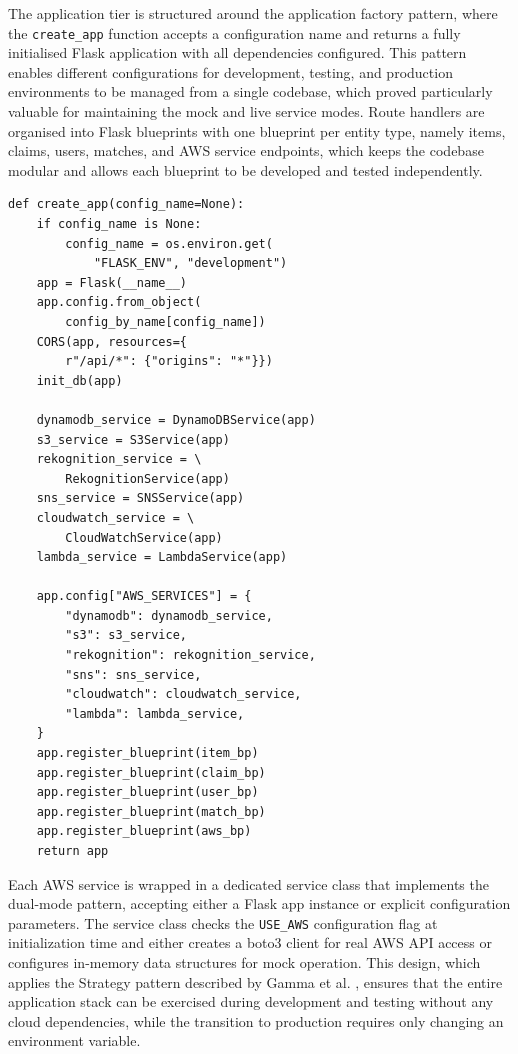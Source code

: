 \documentclass[conference]{IEEEtran}
\begin{document}
The application tier is structured around the application factory pattern, where the \texttt{create\_app} function accepts a configuration name and returns a fully initialised Flask application with all dependencies configured. This pattern enables different configurations for development, testing, and production environments to be managed from a single codebase, which proved particularly valuable for maintaining the mock and live service modes. Route handlers are organised into Flask blueprints with one blueprint per entity type, namely items, claims, users, matches, and AWS service endpoints, which keeps the codebase modular and allows each blueprint to be developed and tested independently.

\begin{lstlisting}[caption={Application factory with AWS service initialization}]
def create_app(config_name=None):
    if config_name is None:
        config_name = os.environ.get(
            "FLASK_ENV", "development")
    app = Flask(__name__)
    app.config.from_object(
        config_by_name[config_name])
    CORS(app, resources={
        r"/api/*": {"origins": "*"}})
    init_db(app)

    dynamodb_service = DynamoDBService(app)
    s3_service = S3Service(app)
    rekognition_service = \
        RekognitionService(app)
    sns_service = SNSService(app)
    cloudwatch_service = \
        CloudWatchService(app)
    lambda_service = LambdaService(app)

    app.config["AWS_SERVICES"] = {
        "dynamodb": dynamodb_service,
        "s3": s3_service,
        "rekognition": rekognition_service,
        "sns": sns_service,
        "cloudwatch": cloudwatch_service,
        "lambda": lambda_service,
    }
    app.register_blueprint(item_bp)
    app.register_blueprint(claim_bp)
    app.register_blueprint(user_bp)
    app.register_blueprint(match_bp)
    app.register_blueprint(aws_bp)
    return app
\end{lstlisting}

Each AWS service is wrapped in a dedicated service class that implements the dual-mode pattern, accepting either a Flask app instance or explicit configuration parameters. The service class checks the \texttt{USE\_AWS} configuration flag at initialization time and either creates a boto3 client for real AWS API access or configures in-memory data structures for mock operation. This design, which applies the Strategy pattern described by Gamma et al. \cite{gamma1994design}, ensures that the entire application stack can be exercised during development and testing without any cloud dependencies, while the transition to production requires only changing an environment variable.
\end{document}
